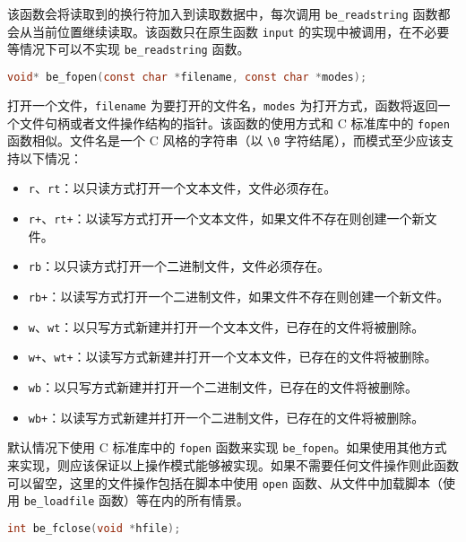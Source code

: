 该函数会将读取到的换行符加入到读取数据中，每次调用 \texttt{be\_readstring} 函数都会从当前位置继续读取。该函数只在原生函数 \texttt{input} 的实现中被调用，在不必要等情况下可以不实现 \texttt{be\_readstring} 函数。


\begin{lstlisting}[language=c, numbers=none]
void* be_fopen(const char *filename, const char *modes);
\end{lstlisting}

打开一个文件，\texttt{filename} 为要打开的文件名，\texttt{modes} 为打开方式，函数将返回一个文件句柄或者文件操作结构的指针。该函数的使用方式和 C 标准库中的 \texttt{fopen} 函数相似。文件名是一个 C 风格的字符串（以 \texttt{\textbackslash 0} 字符结尾），而模式至少应该支持以下情况：

\begin{itemize}
    \item \texttt{r}、\texttt{rt}：以只读方式打开一个文本文件，文件必须存在。
    \item \texttt{r+}、\texttt{rt+}：以读写方式打开一个文本文件，如果文件不存在则创建一个新文件。
    \item \texttt{rb}：以只读方式打开一个二进制文件，文件必须存在。
    \item \texttt{rb+}：以读写方式打开一个二进制文件，如果文件不存在则创建一个新文件。
    \item \texttt{w}、\texttt{wt}：以只写方式新建并打开一个文本文件，已存在的文件将被删除。
    \item \texttt{w+}、\texttt{wt+}：以读写方式新建并打开一个文本文件，已存在的文件将被删除。
    \item \texttt{wb}：以只写方式新建并打开一个二进制文件，已存在的文件将被删除。
    \item \texttt{wb+}：以读写方式新建并打开一个二进制文件，已存在的文件将被删除。
\end{itemize}

默认情况下使用 C 标准库中的 \texttt{fopen} 函数来实现 \texttt{be\_fopen}。如果使用其他方式来实现，则应该保证以上操作模式能够被实现。如果不需要任何文件操作则此函数可以留空，这里的文件操作包括在脚本中使用 \texttt{open} 函数、从文件中加载脚本（使用 \texttt{be\_loadfile} 函数）等在内的所有情景。


\begin{lstlisting}[language=c, numbers=none]
int be_fclose(void *hfile);
\end{lstlisting}

